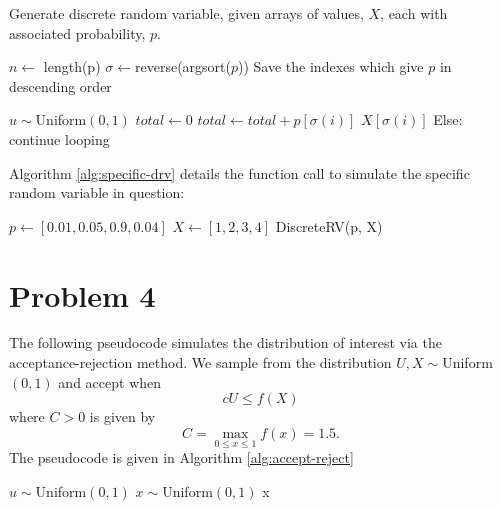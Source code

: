 \documentclass{homework}
\begin{document}
\begin{algorithm}
    \caption{Discrete Random Variable}\label{alg:discrete-rv}
\begin{algorithmic}
               \Comment Generate discrete random variable, given arrays
        \State \Comment of values, $X$, each with associated probability, $p$.

        \State $n \gets $ length(p)
        \State $\sigma \gets $reverse(argsort($p$))
        \Comment Save the indexes which give $p$ in descending order

        \State $u  \sim  $Uniform$(0, 1)$
        \State $total \gets 0$
            \State $total \gets total + p[\sigma(i)]$
                \State \Return $X[\sigma(i)]$
            \EndIf \Comment Else: continue looping
        \EndFor
    \EndFunction
\end{algorithmic}
\end{algorithm}

Algorithm \ref{alg:specific-drv} details the function call to simulate
the specific random variable in question:
\begin{algorithm}
    \caption{Sample specific Random Variable}\label{alg:specific-drv}
\begin{algorithmic}
    \State $p \gets [0.01, 0.05, 0.9, 0.04]$
    \State $X \gets [1, 2, 3, 4]$
    \State \Return DiscreteRV(p, X)
\end{algorithmic}
\end{algorithm}

\section{Problem 4}
The following pseudocode simulates the distribution of interest via the
acceptance-rejection method. We sample from the distribution
$U,X \sim $Uniform$(0, 1)$ and accept when
\begin{equation*}
    cU \leq f(X)
\end{equation*}
where $C>0$ is given by
\begin{equation*}
    C = \max_{0\leq x \leq 1} f(x) = 1.5.
\end{equation*}
The pseudocode is given in Algorithm \ref{alg:accept-reject}

\begin{algorithm}
    \caption{Simulating via Acceptance-Rejection Method}\label{alg:accept-reject}
\begin{algorithmic}
    \Loop
        \State $u  \sim  $Uniform$(0, 1)$
        \State $x  \sim  $Uniform$(0, 1)$
            \State \Return x
        \EndIf
    \EndLoop
\end{algorithmic}
\end{algorithm}
\end{document}
